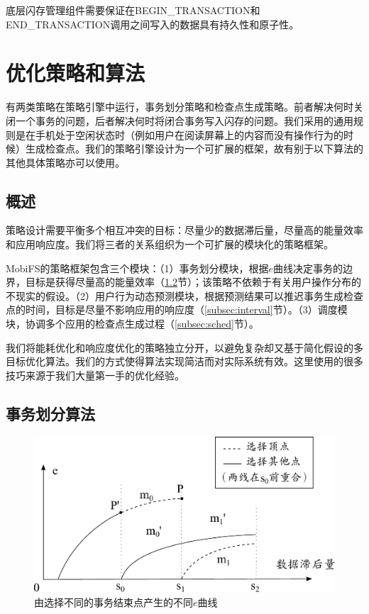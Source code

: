 底层闪存管理组件需要保证在BEGIN\_TRANSACTION和END\_TRANSACTION调用之间写入的数据具有持久性和原子性。 

\section{优化策略和算法}

有两类策略在策略引擎中运行，事务划分策略和检查点生成策略。前者解决何时关闭一个事务的问题，后者解决何时将闭合事务写入闪存的问题。我们采用的通用规则是在手机处于空闲状态时（例如用户在阅读屏幕上的内容而没有操作行为的时候）生成检查点。我们的策略引擎设计为一个可扩展的框架，故有别于以下算法的其他具体策略亦可以使用。

\subsection{概述}

策略设计需要平衡多个相互冲突的目标：尽量少的数据滞后量，尽量高的能量效率和应用响应度。我们将三者的关系组织为一个可扩展的模块化的策略框架。 

MobiFS的策略框架包含三个模块：（1）事务划分模块，根据$e$曲线决定事务的边界，目标是获得尽量高的能量效率（\ref{subsec:point}节）；该策略不依赖于有关用户操作分布的不现实的假设。（2）用户行为动态预测模块，根据预测结果可以推迟事务生成检查点的时间，目标是尽量不影响应用的响应度（\ref{subsec:interval}节）。（3）调度模块，协调多个应用的检查点生成过程（\ref{subsec:sched}节）。 
 
我们将能耗优化和响应度优化的策略独立分开，以避免复杂却又基于简化假设的多目标优化算法。我们的方式使得算法实现简洁而对实际系统有效。这里使用的很多技巧来源于我们大量第一手的优化经验。 

\subsection{事务划分算法}
\label{subsec:point}

\begin{figure}
\centering
\includegraphics[width=0.7\columnwidth]{figures/tpl}
\caption{由选择不同的事务结束点产生的不同$e$曲线}
\label{fig:tpl}
\end{figure}

